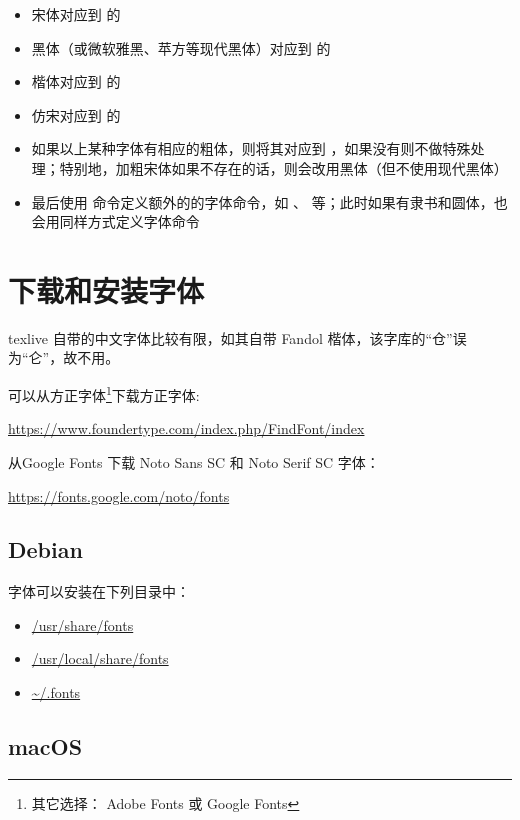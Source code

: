 \begin{itemize}
  \item 宋体对应到 \texttt{\rmfamily} 的 \texttt{\upshape}
  \item 黑体（或微软雅黑、苹方等现代黑体）对应到 \texttt{\sffamily} 的 \texttt{\upshape}
  \item 楷体对应到 \texttt{\rmfamily} 的 \texttt{\itshape}
  \item 仿宋对应到 \texttt{\ttfamily} 的 \texttt{\upshape}
  \item 如果以上某种字体有相应的粗体，则将其对应到 \texttt{\bfseries}，如果没有则不做特殊处理；特别地，加粗宋体如果不存在的话，则会改用黑体（但不使用现代黑体）
  \item 最后使用 \texttt{\setCJKfamilyfont} 命令定义额外的的字体命令，如 \texttt{\songti}、\texttt{\heiti} 等；此时如果有隶书和圆体，也会用同样方式定义字体命令
\end{itemize}

\section{下载和安装字体}

texlive 自带的中文字体比较有限，如其自带 Fandol 楷体，该字库的“仓”误为“仑”，故不用。

可以从方正字体\footnote{其它选择： Adobe Fonts 或 Google Fonts}下载方正字体:

\url{https://www.foundertype.com/index.php/FindFont/index}

从Google Fonts 下载 Noto Sans SC 和 Noto Serif SC 字体：

\url{https://fonts.google.com/noto/fonts}

\subsection{Debian}

字体可以安装在下列目录中：

\begin{itemize}
  \item \url{/usr/share/fonts}
  \item \url{/usr/local/share/fonts}
  \item \url{~/.fonts}
\end{itemize}

\subsection{macOS}


